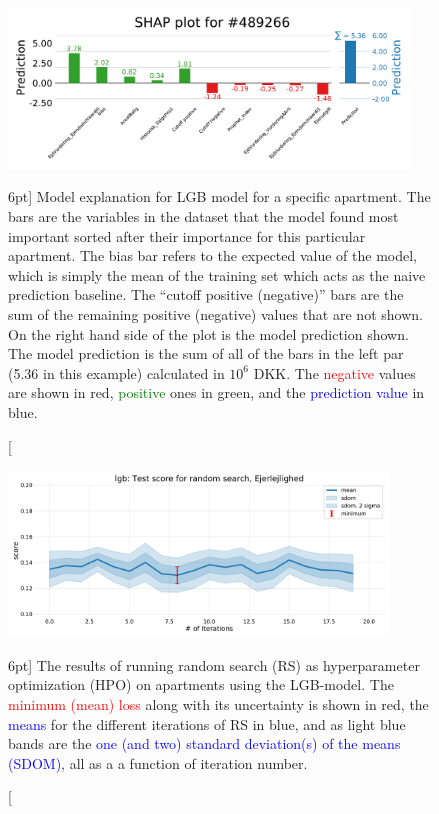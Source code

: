 \documentclass[a4paper, twoside, nobib]{tufte-book}
\newcommand{\q}[1]{``#1''}
\begin{document}
\begin{figure}
  \includegraphics[width=0.95\textwidth, trim=0 0 0 40, clip]{figures/housing/Ejerlejlighed_v17_cut_all_Ncols_all_SHAP_fig_loc=489266.pdf}
  \caption[SHAP Prediction Explanation for apartment][6pt]
          {Model explanation for LGB model for a specific apartment. The bars are the variables in the dataset that the model found most important sorted after their importance for this particular apartment. The bias bar refers to the expected value of the model, which is simply the mean of the training set which acts as the naive prediction baseline. The \q{cutoff positive (negative)} bars are the sum of the remaining positive (negative) values that are not shown. On the right hand side of the plot is the model prediction shown. The model prediction is the sum of all of the bars in the left par (5.36 in this example) calculated in $10^6$ DKK. The \textcolor{red}{negative} values are shown in red, \textcolor{green}{positive} ones in green, and the \textcolor{blue}{prediction value} in blue. 
          } 
  \label{fig:h:shap_single_apartment}
\end{figure}


\begin{figure}
  \includegraphics[width=0.9\textwidth, trim=0 0 0 40, clip]{figures/housing/Ejerlejlighed_v17_cut_all_Ncols_all_lgb_score_over_time_random.pdf}
  \caption[Hyperparameter optimization: random search results][6pt]
          {The results of running random search (RS) as hyperparameter optimization (HPO) on apartments using the LGB-model. The \textcolor{red}{minimum (mean) loss} along with its uncertainty is shown in red, the \textcolor{blue}{means} for the different iterations of RS in blue, and as light blue bands are the \textcolor{blue}{one (and two) standard deviation(s) of the means (SDOM)}, all as a a function of iteration number.  
          } 
  \label{fig:h:RS_lgb_apartment}
\end{figure}
\end{document}
